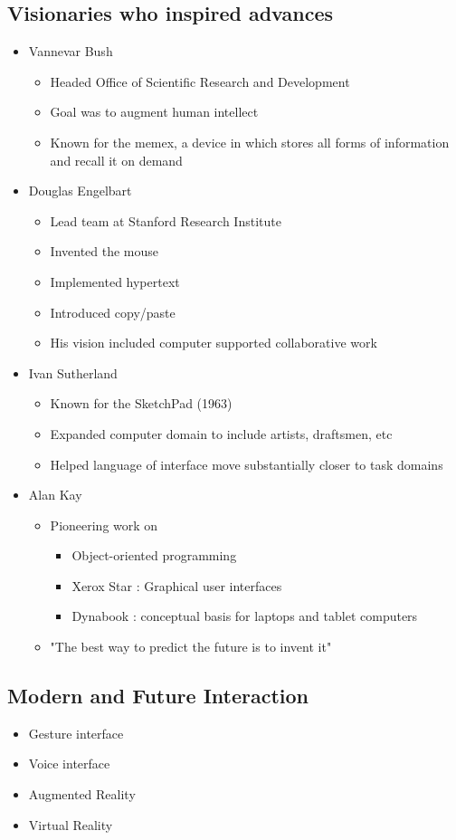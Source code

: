 \documentclass[twoside]{article}
\begin{document}
\subsection{Visionaries who inspired advances}
\begin{itemize}
\item Vannevar Bush
\begin{itemize}
\item Headed Office of Scientific Research and Development
\item Goal was to augment human intellect 
\item Known for the memex, a device in which stores all forms of information and recall it on demand 
\end{itemize}
\item Douglas Engelbart
\begin{itemize}
\item Lead team at Stanford Research Institute 
\item Invented the mouse 
\item Implemented hypertext
\item Introduced copy/paste
\item His vision included computer supported collaborative work
\end{itemize}
\item Ivan Sutherland
\begin{itemize}
\item Known for the SketchPad (1963)
\item Expanded computer domain to include artists, draftsmen, etc
\item Helped language of interface move substantially closer to task domains
\end{itemize}
\item Alan Kay
\begin{itemize}
\item Pioneering work on 
\begin{itemize}
\item Object-oriented programming
\item Xerox Star : Graphical user interfaces 
\item Dynabook : conceptual basis for laptops and tablet computers
\end{itemize}
\item "The best way to predict the future is to invent it"
\end{itemize}
\end{itemize}

\subsection{Modern and Future Interaction}
\begin{itemize}
\item Gesture interface
\item Voice interface
\item Augmented Reality 
\item Virtual Reality 
\end{itemize}
\end{document}
